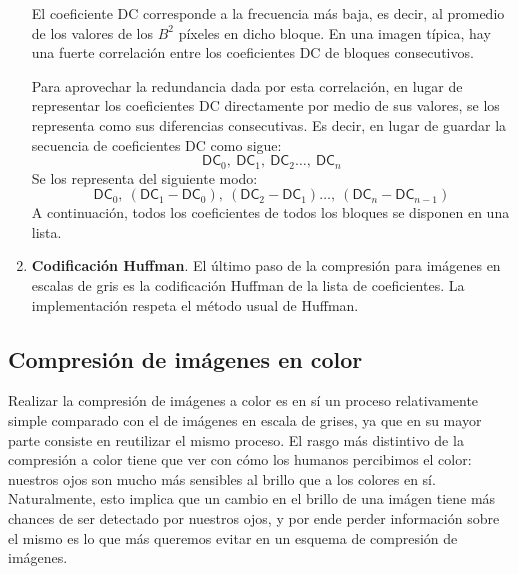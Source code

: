 \documentclass{article}
\begin{document}
\begin{enumerate}
  El coeficiente DC corresponde a la frecuencia más baja, es
  decir, al promedio de los valores de los $B^2$ píxeles en
  dicho bloque.
  En una imagen típica, hay una fuerte correlación entre los
  coeficientes DC de bloques consecutivos.

  Para aprovechar la redundancia dada por esta correlación,
  en lugar de representar los coeficientes DC directamente por
  medio de sus valores,
  se los representa como sus diferencias consecutivas.
  Es decir, en lugar de guardar la secuencia de coeficientes
  DC como sigue:
  \[
    \mathsf{DC}_0,\ \mathsf{DC}_1,\ \mathsf{DC}_2 \hdots,\ \mathsf{DC}_n
  \]
  Se los representa del siguiente modo:
  \[
    \mathsf{DC}_0,\ (\mathsf{DC}_1 - \mathsf{DC}_0),\ (\mathsf{DC}_2 - \mathsf{DC}_1) \hdots,\ (\mathsf{DC}_n - \mathsf{DC}_{n-1})
  \]
  A continuación, todos los coeficientes de todos los bloques
  se disponen en una lista.
\item
  {\bf Codificación Huffman}.
  El último paso de la compresión para imágenes en escalas de
  gris es la codificación Huffman de la lista de coeficientes.
  La implementación respeta el método usual de Huffman.
\end{enumerate}

\subsection{Compresión de imágenes en color}

Realizar la compresión de imágenes a color es en sí un proceso relativamente simple comparado con el de imágenes en escala de grises, ya que en su mayor parte consiste en reutilizar el mismo proceso. El rasgo más distintivo de la compresión a color tiene que ver con cómo los humanos percibimos el color: nuestros ojos son mucho más sensibles al brillo que a los colores en sí. Naturalmente, esto implica que un cambio en el brillo de una imágen tiene más chances de ser detectado por nuestros ojos, y por ende perder información sobre el mismo es lo que más queremos evitar en un esquema de compresión de imágenes.
\end{document}
